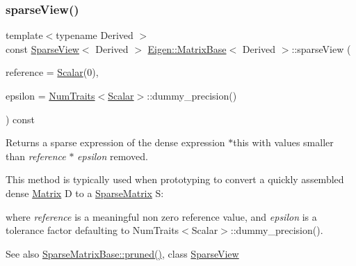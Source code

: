\subsubsection{\texorpdfstring{sparseView()}{sparseView()}}
{\footnotesize\ttfamily template$<$typename Derived $>$ \\
const \mbox{\hyperlink{class_eigen_1_1_sparse_view}{Sparse\+View}}$<$ Derived $>$ \mbox{\hyperlink{class_eigen_1_1_matrix_base}{Eigen\+::\+Matrix\+Base}}$<$ Derived $>$\+::sparse\+View (\begin{DoxyParamCaption}\item[{const \mbox{\hyperlink{class_eigen_1_1_dense_base_a5feed465b3a8e60c47e73ecce83e39a2}{Scalar}} \&}]{reference = {\ttfamily \mbox{\hyperlink{class_eigen_1_1_dense_base_a5feed465b3a8e60c47e73ecce83e39a2}{Scalar}}(0)},  }\item[{const typename \mbox{\hyperlink{struct_eigen_1_1_num_traits}{Num\+Traits}}$<$ \mbox{\hyperlink{class_eigen_1_1_dense_base_a5feed465b3a8e60c47e73ecce83e39a2}{Scalar}} $>$\+::Real \&}]{epsilon = {\ttfamily \mbox{\hyperlink{struct_eigen_1_1_num_traits}{Num\+Traits}}$<$\mbox{\hyperlink{class_eigen_1_1_dense_base_a5feed465b3a8e60c47e73ecce83e39a2}{Scalar}}$>$\+:\+:dummy\+\_\+precision()} }\end{DoxyParamCaption}) const}

\begin{DoxyReturn}{Returns}
a sparse expression of the dense expression {\ttfamily $\ast$this} with values smaller than {\itshape reference} $\ast$ {\itshape epsilon} removed.
\end{DoxyReturn}
This method is typically used when prototyping to convert a quickly assembled dense \mbox{\hyperlink{class_eigen_1_1_matrix}{Matrix}} {\ttfamily D} to a \mbox{\hyperlink{class_eigen_1_1_sparse_matrix}{Sparse\+Matrix}} {\ttfamily S\+:} 
\begin{DoxyCode}{0}
\end{DoxyCode}
 where {\itshape reference} is a meaningful non zero reference value, and {\itshape epsilon} is a tolerance factor defaulting to Num\+Traits$<$\+Scalar$>$\+::dummy\+\_\+precision().

\begin{DoxySeeAlso}{See also}
\mbox{\hyperlink{class_eigen_1_1_sparse_matrix_base_ac8d0414b56d9d620ce9a698c1b281e5d}{Sparse\+Matrix\+Base\+::pruned()}}, class \mbox{\hyperlink{class_eigen_1_1_sparse_view}{Sparse\+View}} 
\end{DoxySeeAlso}
\mbox{\label{class_eigen_1_1_matrix_base_a8782faeb21e43908cdce47cec06fba23}} 
